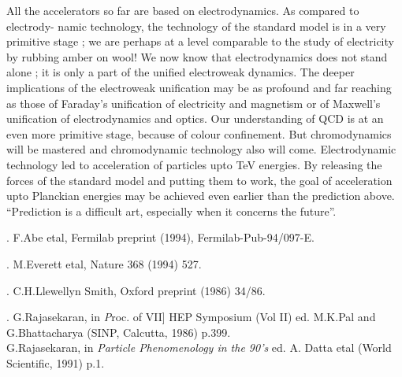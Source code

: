 All the accelerators so far are based on electrodynamics. As compared to electrody-
namic technology, the technology of the standard model is in a very primitive stage ; we
are perhaps at a level comparable to the study of electricity by rubbing amber on wool!
We now know that electrodynamics does not stand alone ; it is only a part of the unified
electroweak dynamics. The deeper implications of the electroweak unification may be as
profound and far reaching as those of Faraday’s unification of electricity and magnetism
or of Maxwell’s unification of electrodynamics and optics. Our understanding of QCD is
at an even more primitive stage, because of colour confinement. But chromodynamics will
be mastered and chromodynamic technology also will come. Electrodynamic technology
led to acceleration of particles upto TeV energies. By releasing the forces of the standard
model and putting them to work, the goal of acceleration upto Planckian energies may be
achieved even earlier than the prediction above. “Prediction is a difficult art, especially
when it concerns the future”.


\begin{thebibliography}{99}


. F.Abe etal, Fermilab preprint (1994), Fermilab-Pub-94/097-E.

. M.Everett etal, Nature 368 (1994) 527.

. C.H.Llewellyn Smith, Oxford preprint (1986) 34/86.

. G.Rajasekaran, in {\textit Proc. of VII] HEP Symposium (Vol II)} ed. M.K.Pal and G.Bhattacharya
(SINP, Calcutta, 1986) p.399.\\
G.Rajasekaran, in \textit{Particle Phenomenology in the 90’s} ed. A. Datta etal (World
Scientific, 1991) p.1.
\end{thebibliography}





